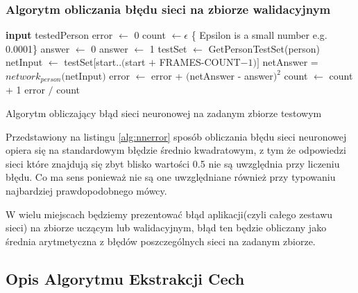 \documentclass[a4paper]{article}
\begin{document}
	\subsubsection*{Algorytm obliczania błędu sieci na zbiorze walidacyjnym}
	\begin{algorithm}[h]
		\begin{algorithmic}[1]
		\STATE \textbf{input} testedPerson
		\STATE
		\STATE error $\leftarrow$ 0
		\STATE count $\leftarrow \epsilon$ \{ Epsilon is a small number e.g. 0.0001\}
			\STATE answer $\leftarrow$ 0
				\STATE answer $\leftarrow$ 1			
			\ENDIF		
			\STATE	
			\STATE {}			
			\STATE testSet $\leftarrow$ GetPersonTestSet(person)
				\STATE netInput $\leftarrow$ testSet$[$start$ .. ($start $+$ FRAMES-COUNT$-1)]$
				\STATE netAnswer = $network_{person}($netInput$)$
					\STATE error $\leftarrow$ error + $($netAnswer - answer$)^2$
					\STATE count $\leftarrow$ count + 1
				\ENDIF
			\ENDFOR	
		\ENDFOR
		\STATE
		\RETURN error $/$ count
		\end{algorithmic}			
		\caption{Algorytm obliczający błąd sieci neuronowej na zadanym zbiorze testowym}
		\label{alg:nnerror}
	\end{algorithm}
	Przedstawiony na listingu \ref{alg:nnerror} sposób obliczania błędu  sieci neuronowej
	opiera się na standardowym błędzie średnio kwadratowym, z tym że odpowiedzi sieci które
	znajdują się zbyt blisko wartości 0.5 nie są uwzględnia przy liczeniu błędu. Co ma sens 
	ponieważ nie są one uwzględniane również przy typowaniu najbardziej prawdopodobnego mówcy.
	
	W wielu miejscach będziemy prezentować błąd aplikacji(czyli całego zestawu sieci) na zbiorze uczącym
	lub walidacyjnym, błąd ten będzie obliczany jako średnia arytmetyczna z błędów poszczególnych sieci
	na zadanym zbiorze.
	
	\subsection{Opis Algorytmu Ekstrakcji Cech}
	
\end{document}
